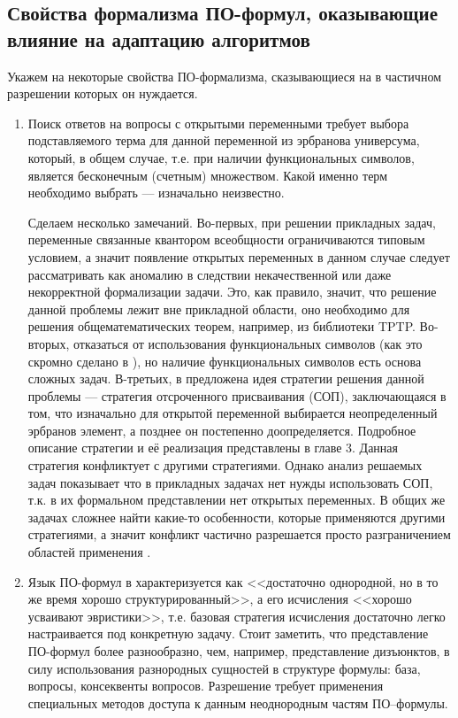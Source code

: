\subsection{Свойства формализма ПО-формул, оказывающие влияние на адаптацию алгоритмов}
Укажем на некоторые свойства ПО-формализма, сказывающиеся на  в частичном разрешении которых он нуждается.
\begin{enumerate}
\item Поиск ответов на вопросы с открытыми переменными требует выбора   подставляемого терма для данной переменной из эрбранова универсума,   который, в общем случае, т.е. при наличии функциональных символов, является бесконечным (счетным) множеством. Какой именно терм необходимо выбрать --- изначально неизвестно.

Сделаем несколько замечаний. Во-первых, при решении прикладных задач, переменные связанные квантором всеобщности ограничиваются типовым условием, а значит появление открытых переменных в данном случае следует рассматривать как аномалию в следствии некачественной или даже некорректной формализации задачи. Это, как правило, значит, что решение данной проблемы лежит вне прикладной области, оно необходимо для решения общематематических теорем, например, из библиотеки TPTP.  Во-вторых, отказаться от использования функциональных символов (как это скромно сделано в \cite{ICDS2000}), но наличие функциональных символов есть основа сложных задач. В-третьих, в \cite{ICDS2000} предложена идея стратегии решения данной проблемы --- стратегия отсроченного присваивания (СОП), заключающаяся в том, что изначально для открытой переменной выбирается неопределенный эрбранов элемент, а позднее он постепенно доопределяется. Подробное описание стратегии и её реализация представлены в главе 3. Данная стратегия конфликтует с другими стратегиями. Однако анализ решаемых задач показывает что в  прикладных задачах нет нужды использовать СОП, т.к. в их формальном представлении нет открытых переменных. В общих же задачах сложнее найти какие-то особенности, которые применяются другими стратегиями, а значит конфликт частично разрешается просто разграничением областей применения .

\item Язык ПО-формул в \cite{ICDS2000} характеризуется как <<достаточно   однородной, но в то же время хорошо структурированный>>, а его исчисления  <<хорошо усваивают эвристики>>, т.е. базовая стратегия исчисления достаточно легко настраивается под конкретную задачу. Стоит заметить, что представление ПО-формул более разнообразно, чем, например, представление дизъюнктов, в силу использования разнородных сущностей в структуре формулы: база, вопросы, консеквенты вопросов. Разрешение  требует применения специальных методов доступа к данным неоднородным частям ПО--формулы.


\end{enumerate}

